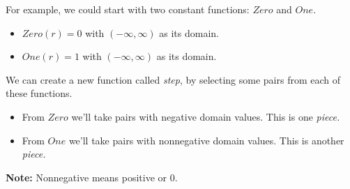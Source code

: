 \documentclass{ximera}
\begin{document}
For example, we could start with two constant functions: $Zero$ and $One$.

\begin{itemize}
\item $Zero(r) = 0$ with $(-\infty, \infty)$ as its domain.
\item $One(r) = 1$ with $(-\infty, \infty)$ as its domain.
\end{itemize}

We can create a new function called \textit{step}, by selecting some pairs from each of these functions.  
\begin{itemize}
\item From $Zero$ we'll take pairs with negative domain values. This is one \textit{piece.}
\item From $One$ we'll take pairs with nonnegative domain values. This is another \textit{piece.}
\end{itemize}

\textbf{Note: } Nonnegative means positive or 0.
\end{document}
